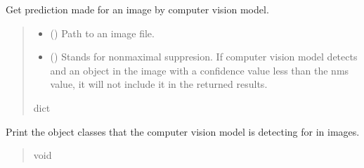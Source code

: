 \documentclass[letterpaper,10pt,english]{sphinxmanual}
\begin{document}
\begin{fulllineitems}
\begin{fulllineitems}
\label{\detokenize{comp_viz.object_detection:comp_viz.object_detection.model.Model.get_prediction}}
\pysigstartsignatures
{}
\pysigstopsignatures
\sphinxAtStartPar
Get prediction made for an image by computer vision model.
\begin{quote}\begin{description}
\begin{itemize}
\item {} 
\sphinxAtStartPar
{} () \textendash{} Path to an image file.

\item {} 
\sphinxAtStartPar
{} () \textendash{} Stands for non\sphinxhyphen{}maximal suppresion. If computer vision model detects and an 
object in the image with a confidence value less than the nms value, it 
will not include it in the returned results.

\end{itemize}

\sphinxAtStartPar
dict

\end{description}\end{quote}

\end{fulllineitems}


\begin{fulllineitems}
\label{\detokenize{comp_viz.object_detection:comp_viz.object_detection.model.Model.list_classes}}
\pysigstartsignatures
{}
\pysigstopsignatures
\sphinxAtStartPar
Print the object classes that the computer vision model is detecting for in images.
\begin{quote}\begin{description}
\sphinxAtStartPar
void

\end{description}\end{quote}


\end{fulllineitems}
\end{fulllineitems}
\end{document}
